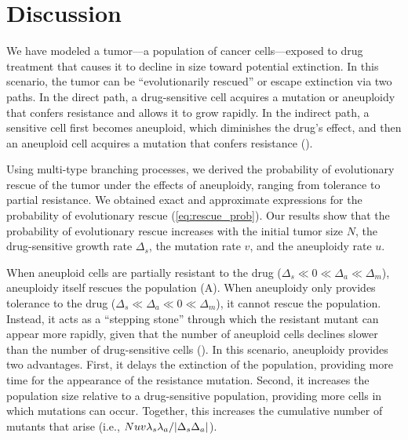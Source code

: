 \documentclass[12pt]{extarticle}
\begin{document}


\section*{Discussion}

We have modeled a tumor---a population of cancer cells---exposed to drug treatment that causes it to decline in size toward potential extinction.
In this scenario, the tumor can be ``evolutionarily rescued'' or escape extinction via two paths.
In the direct path, a drug-sensitive cell acquires a mutation or aneuploidy that confers resistance and allows it to grow rapidly.
In the indirect path, a sensitive cell first becomes aneuploid, which diminishes the drug's effect, and then an aneuploid cell acquires a mutation that confers resistance (). 

Using multi-type branching processes, we derived the probability of evolutionary rescue of the tumor under the effects of aneuploidy, ranging from tolerance to partial resistance.
We obtained exact and approximate expressions for the probability of evolutionary rescue (\cref{eq:rescue_prob}). 
Our results show that the probability of evolutionary rescue increases with the initial tumor size $N$, the drug-sensitive growth rate $\Delta_s$, the mutation rate $v$, and the aneuploidy rate $u$.

When aneuploid cells are partially resistant to the drug ($\Delta_s\ll0\ll\Delta_a\ll\Delta_m$), aneuploidy itself rescues the population (A). 
When aneuploidy only provides tolerance to the drug ($\Delta_s\ll\Delta_a\ll0\ll\Delta_m$), it cannot rescue the population.
Instead, it acts as a ``stepping stone'' through which the resistant mutant can appear more rapidly, given that the number of aneuploid cells declines slower than the number of drug-sensitive cells (). In this scenario, aneuploidy provides two advantages. First, it delays the extinction of the population, providing more time for the appearance of the resistance mutation. Second, it increases the population size relative to a drug-sensitive population, providing more cells in which mutations can occur. Together, this increases the cumulative number of mutants that arise (i.e., $Nuv\lambda_s\lambda_a/\abs{\Delta_s\Delta_a}$). %
\end{document}
